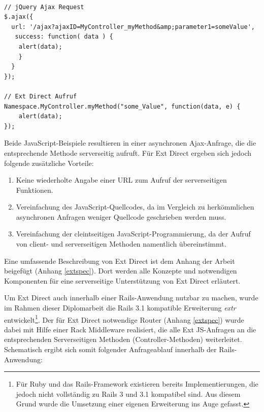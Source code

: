 \begin{lstlisting}[label=extinvoke, caption=Ajax-Anfrage an einen Server im jQuery-Framework]

// jQuery Ajax Request
$.ajax({
  url: '/ajax?ajaxID=MyController_myMethod&amp;parameter1=someValue',
   success: function( data ) {
    alert(data);
    }
  }
});

// Ext Direct Aufruf
Namespace.MyController.myMethod("some_Value", function(data, e) {
  	alert(data);
});

\end{lstlisting}

Beide JavaScript-Beispiele resultieren in einer asynchronen Ajax-Anfrage, die die entsprechende Methode serverseitig aufruft. Für Ext Direct ergeben sich jedoch folgende zusätzliche Vorteile:

\begin{enumerate}
\item
Keine wiederholte Angabe einer URL zum Aufruf der serverseitigen Funktionen.
\item
Vereinfachung des JavaScript-Quellcodes, da im Vergleich zu herkömmlichen asynchronen Anfragen weniger Quellcode geschrieben werden muss.
\item
Vereinfachung der cleintseitigen JavaScript-Programmierung, da der Aufruf von client- und serverseitigen Methoden namentlich übereinstimmt.
\end{enumerate}

Eine umfassende Beschreibung von Ext Direct ist dem Anhang der Arbeit beigefügt (Anhang \ref{extspec}). Dort werden alle Konzepte und notwendigen Komponenten für eine serverseitige Unterstützung von Ext Direct erläutert.


Um Ext Direct auch innerhalb einer Rails-Anwendung nutzbar zu machen, wurde im Rahmen dieser Diplomarbeit die Rails 3.1 kompatible Erweiterung \emph{extr} entwickelt\footnote{Für Ruby und das Rails-Framework existieren bereits Implementierungen, die jedoch nicht vollständig zu Rails 3 und 3.1 kompatibel sind. Aus diesem Grund wurde die Umsetzung einer eigenen Erweiterung ins Auge gefasst.}.
Der für Ext Direct notwendige Router (Anhang \ref{extspec}) wurde dabei mit Hilfe einer Rack Middleware realisiert, die alle Ext JS-Anfragen an die entsprechenden Serverseitigen Methoden (Controller-Methoden) weiterleitet. Schematisch ergibt sich somit folgender Anfrageablauf innerhalb der Rails-Anwendung:

